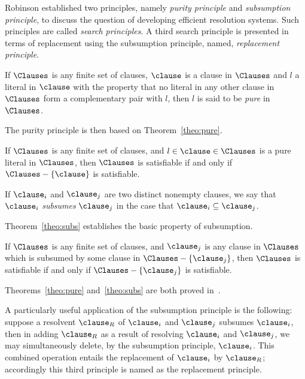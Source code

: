 Robinson established two principles, namely \emph{purity principle} and
\emph{subsumption principle}, to discuss the question of developing efficient
resolution systems. Such principles are called \emph{search principles}. A third
search principle is presented in terms of replacement using the subsumption
principle, named, \emph{replacement principle}. 

\begin{definition}
    If $\Clauses$ is any finite set of clauses, $\clause$ is a clause in
    $\Clauses$ and $l$ a literal in $\clause$ with the property that no literal
    in any other clause in $\Clauses$ form a complementary pair with $l$, then
    $l$ is said to be \emph{pure} in $\Clauses$.
\end{definition}

The purity principle is then based on Theorem~\ref{theo:pure}.

\begin{theorem}%
    \label{theo:pure}
    If $\Clauses$ is any finite set of clauses, and $l \in \clause \in \Clauses$
    is a pure literal in $\Clauses$, then $\Clauses$ is satisfiable if and only
    if $\Clauses - \{\clause\}$ is satisfiable.
\end{theorem}

\begin{definition}
    If $\clause_i$ and $\clause_j$ are two distinct nonempty clauses, we say
    that $\clause_i$ \emph{subsumes} $\clause_j$ in the case that $\clause_i
    \subseteq \clause_j$. 
\end{definition}

Theorem~\ref{theo:subs} establishes the basic property of subsumption.

\begin{theorem}%
    \label{theo:subs}
    If $\Clauses$ is any finite set of clauses, and $\clause_j$ is any clause
    in $\Clauses$ which is subsumed by some clause in $\Clauses -
    \{\clause_j\}$, then $\Clauses$ is satisfiable if and only if $\Clauses -
    \{\clause_j\}$ is satisfiable.
\end{theorem}

Theorems~\ref{theo:pure} and~\ref{theo:subs} are both proved in~\cite{Robinson65}.

A particularly useful application of the subsumption principle is the following:
suppose a resolvent $\clause_R$ of $\clause_i$ and $\clause_j$ subsumes
$\clause_i$, then in adding $\clause_R$ as a result of resolving $\clause_i$ and
$\clause_j$, we may simultaneously delete, by the subsumption principle,
$\clause_i$. This combined operation entails the replacement of $\clause_i$ by
$\clause_R$; accordingly this third principle is named as the
replacement principle.

